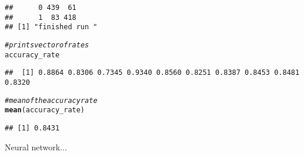 \documentclass[titlepage]{article}\usepackage[]{graphicx}\usepackage[]{color}
\makeatletter
\newcommand{\hlcom}[1]{\textcolor[rgb]{0.678,0.584,0.686}{\textit{#1}}}%
\newcommand{\hlstd}[1]{\textcolor[rgb]{0.345,0.345,0.345}{#1}}%
\newcommand{\hlkwd}[1]{\textcolor[rgb]{0.737,0.353,0.396}{\textbf{#1}}}%
\newenvironment{kframe}{%
 \def\at@end@of@kframe{}%
 \ifinner\ifhmode%
  \def\at@end@of@kframe{\end{minipage}}%
  \begin{minipage}{\columnwidth}%
 \fi\fi%
 \def\FrameCommand##1{\hskip\@totalleftmargin \hskip-\fboxsep
 \colorbox{shadecolor}{##1}\hskip-\fboxsep
     \hskip-\linewidth \hskip-\@totalleftmargin \hskip\columnwidth}%
 \MakeFramed {\advance\hsize-\width
   \@totalleftmargin\z@ \linewidth\hsize
   \@setminipage}}%
 {\par\unskip\endMakeFramed%
 \at@end@of@kframe}
\newenvironment{knitrout}{}{} %
\makeatother
\begin{document}
\begin{knitrout}
\begin{kframe}
\begin{verbatim}
##      0 439  61
##      1  83 418
## [1] "finished run "
\end{verbatim}
\begin{alltt}
\hlcom{# prints vector of rates}
\hlstd{accuracy_rate}
\end{alltt}
\begin{verbatim}
##  [1] 0.8864 0.8306 0.7345 0.9340 0.8560 0.8251 0.8387 0.8453 0.8481 0.8320
\end{verbatim}
\begin{alltt}
\hlcom{# mean of the accuracy rate}
\hlkwd{mean}\hlstd{(accuracy_rate)}
\end{alltt}
\begin{verbatim}
## [1] 0.8431
\end{verbatim}
\end{kframe}
\end{knitrout}

Neural network...
\end{document}

